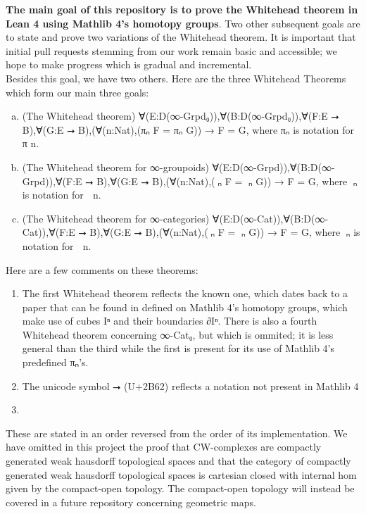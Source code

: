 \documentclass{book}
\theoremstyle{definition}
\begin{document}
{\bf The main goal of this repository is to prove the Whitehead theorem in Lean 4 using Mathlib 4's homotopy groups}. Two other subsequent goals are to state and prove two variations of the Whitehead theorem. It is important that initial pull requests stemming from our work remain basic and accessible; we hope to make progress which is gradual and incremental.\\

Besides this goal, we have two others. Here are the three Whitehead Theorems which form our main three goals:

\begin{enumerate}[(a)]
\item (The Whitehead theorem) ∀(E:D(∞-Grpd₀)),∀(B:D(∞-Grpd₀)),∀(F:E ⭢ B),∀(G:E ⭢ B),(∀(n:Nat),(πₙ F = πₙ G)) → F = G, where πₙ is notation for π n.
\item (The Whitehead theorem for ∞-groupoids) ∀(E:D(∞-Grpd)),∀(B:D(∞-Grpd)),∀(F:E ⭢ B),∀(G:E ⭢ B),(∀(n:Nat),(π⃡ₙ F = π⃡ₙ G)) → F = G, where π⃡ₙ is notation for π⃡ n.
\item (The Whitehead theorem for ∞-categories) ∀(E:D(∞-Cat)),∀(B:D(∞-Cat)),∀(F:E ⭢ B),∀(G:E ⭢ B),(∀(n:Nat),(π⃗ₙ F = π⃗ₙ G)) → F = G, where π⃗ₙ is notation for π⃗ n.
\end{enumerate}

Here are a few comments on these theorems:
\begin{enumerate}
\item The first Whitehead theorem reflects the known one, which dates back to a paper that can be found in defined on Mathlib 4's homotopy groups, which make use of cubes Iⁿ and their boundaries ∂Iⁿ. There is also a fourth Whitehead theorem concerning ∞-Cat₀, but which is ommited; it is less general than the third while the first is present for its use of Mathlib 4's predefined πₙ's.
\item The unicode symbol ⭢ (U+2B62) reflects a notation not present in Mathlib 4
\item 
\end{enumerate}

These are stated in an order reversed from the order of its implementation. We have omitted in this project the proof that CW-complexes are compactly generated weak hausdorff topological spaces and that the category of compactly generated weak hausdorff topological spaces is cartesian closed with internal hom given by the compact-open topology. The compact-open topology will instead be covered in a future repository concerning geometric maps.\\
\end{document}
